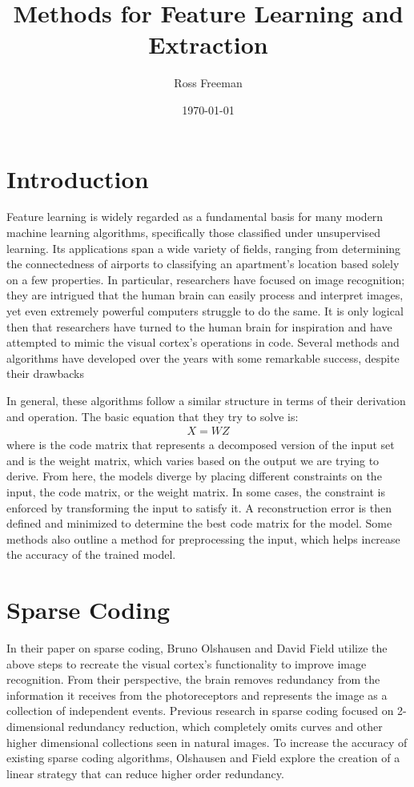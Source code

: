 \documentclass{article}
\begin{document}
\title{Methods for Feature Learning and Extraction}
\author{Ross Freeman}
\date{\today}
\maketitle
\section{Introduction}

Feature learning is widely regarded as a fundamental basis for many modern machine learning algorithms, specifically those classified under unsupervised learning. Its applications span a wide variety of fields, ranging from determining the connectedness of airports to classifying an apartment's location based solely on a few properties. In particular, researchers have focused on image recognition; they are intrigued that the human brain can easily process and interpret images, yet even extremely powerful computers struggle to do the same. It is only logical then that researchers have turned to the human brain for inspiration and have attempted to mimic the visual cortex's operations in code. Several methods and algorithms have developed over the years with some remarkable success, despite their drawbacks
	
In general, these algorithms follow a similar structure in terms of their derivation and operation. The basic equation that they try to solve is:
\begin{align*}
    X = W Z
\end{align*}
where  is the code matrix that represents a decomposed version of the input set and  is the weight matrix, which varies based on the output we are trying to derive. From here, the models diverge by placing different constraints on the input, the code matrix, or the weight matrix. In some cases, the constraint is enforced by transforming the input to satisfy it. A reconstruction error is then defined and minimized to determine the best code matrix for the model. Some methods also outline a method for preprocessing the input, which helps increase the accuracy of the trained model.

\section{Sparse Coding}

In their paper on sparse coding, Bruno Olshausen and David Field utilize the above steps to recreate the visual cortex's functionality to improve image recognition. From their perspective, the brain removes redundancy from the information it receives from the photoreceptors and represents the image as a collection of independent events. Previous research in sparse coding focused on 2-dimensional redundancy reduction, which completely omits curves and other higher dimensional collections seen in natural images. To increase the accuracy of existing sparse coding algorithms, Olshausen and Field explore the creation of a linear strategy that can reduce higher order redundancy. 
\end{document}
